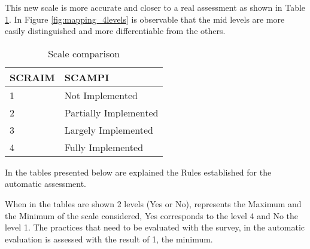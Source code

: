 This new scale is more accurate and closer to a real assessment as shown in Table \ref{tab:rules}. In Figure \ref{fig:mapping_4levels} is observable that the mid levels are more easily distinguished and more differentiable from the others.

\begin{table}[h]
	\centering
	\caption{Scale comparison}
	\begin{tabular}{|p{2cm}|p{4cm}|}
		\hline
		SCRAIM   & SCAMPI    \\
		\hline
		1 & Not Implemented\\
				\hline
				2 & Partially Implemented\\
				\hline
				3 & Largely Implemented\\
				\hline
				4 & Fully Implemented\\
				\hline
	\end{tabular}
	\label{tab:rules}
\end{table}

In the tables presented below are explained the Rules established for the automatic assessment.

When in the tables are shown 2 levels (Yes or No), represents the Maximum and the Minimum of the scale considered, Yes corresponds to the level 4 and No the level 1.
The practices that need to be evaluated with the survey, in the automatic evaluation is assessed with the result of 1, the minimum.


\newpage












